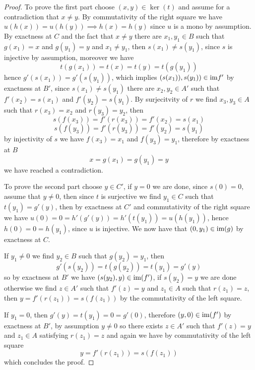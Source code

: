 \begin{proof}[Proof]
    To prove the first part choose $(x,y)\in\ker(t)$ and assume for a contradiction
    that $x\neq y$. By commutativity of the right square we have 
    $u(h(x))=u(h(y)) \implies h(x)=h(y)$ since $u$ is a mono by assumption.
    By exactness at $C$ and the fact that $x\neq y$ there are $x_1,y_1\in B$ such that 
    $g(x_1)=x$ and $g(y_1)=y$ and $x_1\neq y_1$, then $s(x_1)\neq s(y_1)$, since 
    $s$ is injective by assumption, moreover we have  
    \[t(g(x_1))=t(x)=t(y)=t(g(y_1))\]
    hence $g'(s(x_1))=g'(s(y_1))$, which implies 
    $(s(x_1)),s(y_1))\in\text{im} f'$ by exactness at $B'$, since 
    $s(x_1)\neq s(y_1)$ there are $x_2,y_2\in A'$ such that 
    $f'(x_2)=s(x_1)$ and $f'(y_2)=s(y_1)$. By surjecitvity of $r$
    we find $x_3,y_3\in A$ such that 
    $r(x_3)=x_2$ and $r(y_3)=y_2$, then 
    \[
        s(f(x_3))=f'(r(x_3)) = f'(x_2) = s(x_1)
    \]
    \[
        s(f(y_3))=f'(r(y_3)) = f'(y_2) = s(y_1)
    \]
    by injectivity of $s$ we have 
    $f(x_3)=x_1$ and $f(y_3)=y_1$, therefore by exactness at $B$
    \[
        x = g(x_1) = g(y_1) = y
    \]
    we have reached a contradiction.\par
    To prove the second part choose $y\in C'$, if $y=0$ we are done, since $s(0)=0$, assume
    that $y\neq 0$, then since $t$ is surjective we find $y_1\in C$ such that 
    $t(y_1)=g'(y)$, then by exactness at $C'$ and commutativity of the
    right square we have $u(0) = 0 = h'(g'(y)) = h'(t(y_1)) = u(h(y_1))$,
    hence $h(0)=0=h(y_1)$, since $u$ is injective. We now have that 
    $(0,y_1)\in\text{im}(g)$ by exactness at $C$.\par 
    If $y_1\neq 0$ we find $y_2\in B$ such that 
    $g(y_2) = y_1$, then 
    \[
        g'(s(y_2)) = t(g(y_2)) = t(y_1) = g'(y)
    \] 
    so by exactness at $B'$ we have $(s(y_2),y)\in\text{im}(f')$, if $s(y_2)=y$ we are done
    otherwise we find $z\in A'$ such that $f'(z)=y$ and $z_1\in A$
    such that $r(z_1)=z$, then $y=f'(r(z_1)) = s(f(z_1))$ by the commutativity
    of the left square.\par
    If $y_1=0$, then $g'(y)=t(y_1)=0=g'(0)$, therefore $(y,0)\in\text{im}(f')$
    by exactness at $B'$, by assumption $y\neq 0$ so there exists $z\in A'$ 
    such that $f'(z)=y$ and $z_1\in A$ satisfying $r(z_1)=z$ and again we have
    by commutativity of the left square   
    \[
        y = f'(r(z_1)) = s(f(z_1))
    \]
    which concludes the proof.
\end{proof}
